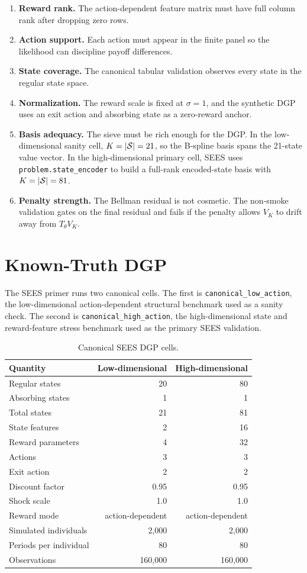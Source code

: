 \documentclass[10pt]{article}
\begin{document}
\begin{enumerate}
\item \textbf{Reward rank.} The action-dependent feature matrix must have full
column rank after dropping zero rows.
\item \textbf{Action support.} Each action must appear in the finite panel so
the likelihood can discipline payoff differences.
\item \textbf{State coverage.} The canonical tabular validation observes every
state in the regular state space.
\item \textbf{Normalization.} The reward scale is fixed at \(\sigma=1\), and
the synthetic DGP uses an exit action and absorbing state as a zero-reward
anchor.
\item \textbf{Basis adequacy.} The sieve must be rich enough for the DGP. In
the low-dimensional sanity cell, \(K=|\mathcal{S}|=21\), so the B-spline basis spans
the 21-state value vector. In the high-dimensional primary cell, SEES uses
\texttt{problem.state\_encoder} to build a full-rank encoded-state basis with
\(K=|\mathcal{S}|=81\).
\item \textbf{Penalty strength.} The Bellman residual is not cosmetic. The
non-smoke validation gates on the final residual and fails if the penalty
allows \(V_K\) to drift away from \(T_\theta V_K\).
\end{enumerate}

\section{Known-Truth DGP}

The SEES primer runs two canonical cells. The first is
\texttt{canonical\_low\_action}, the low-dimensional action-dependent
structural benchmark used as a sanity check. The second is
\texttt{canonical\_high\_action}, the high-dimensional state and reward-feature
stress benchmark used as the primary SEES validation.

\begin{table}[H]
\centering\small
\caption{Canonical SEES DGP cells.}
\begin{tabular}{lrr}
\toprule
Quantity & Low-dimensional & High-dimensional \\
\midrule
Regular states & 20 & 80 \\
Absorbing states & 1 & 1 \\
Total states & 21 & 81 \\
State features & 2 & 16 \\
Reward parameters & 4 & 32 \\
Actions & 3 & 3 \\
Exit action & 2 & 2 \\
Discount factor & 0.95 & 0.95 \\
Shock scale & 1.0 & 1.0 \\
Reward mode & action-dependent & action-dependent \\
Simulated individuals & 2,000 & 2,000 \\
Periods per individual & 80 & 80 \\
Observations & 160,000 & 160,000 \\
\bottomrule
\end{tabular}
\end{table}
\end{document}
